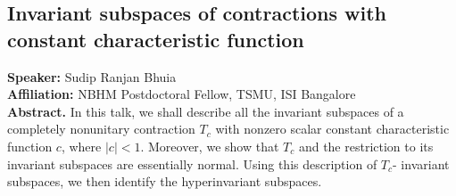\subsection*{Invariant subspaces of contractions with constant characteristic function} %
\noindent
\textbf{Speaker:} Sudip Ranjan Bhuia \\ %
\textbf{Affiliation:} NBHM Postdoctoral Fellow, TSMU, ISI Bangalore \\ %

\noindent\textbf{Abstract.} In this talk, we shall describe all the invariant subspaces of a completely nonunitary contraction $T_c$ with nonzero scalar constant characteristic function $c$, where $|c|<1$. Moreover, we show that $T_c$ and the restriction to its invariant subspaces are essentially normal. Using this description of $T_c$- invariant subspaces, we then identify the hyperinvariant subspaces.


